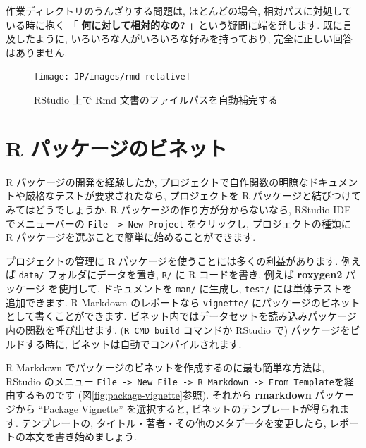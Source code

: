 \documentclass[
  11pt,
  lualatex,ja=standard,jafont=noto]{bxjsreport}
\begin{document}
作業ディレクトリのうんざりする問題は, ほとんどの場合, 相対パスに対処している時に抱く 「 \textbf{何に対して相対的なの?} 」という疑問に端を発します. 既に言及したように, いろいろな人がいろいろな好みを持っており, 完全に正しい回答はありません.

\begin{figure}

{\centering \texttt{[image: JP/images/rmd-relative]} 

}

\caption{RStudio 上で Rmd 文書のファイルパスを自動補完する}\label{fig:rmd-relative}
\end{figure}

\hypertarget{package-vignette}{%
\section{R パッケージのビネット}\label{package-vignette}}

R パッケージの開発を経験したか, プロジェクトで自作関数の明瞭なドキュメントや厳格なテストが要求されたなら, プロジェクトを R パッケージと結びつけてみてはどうでしょうか. R パッケージの作り方が分からないなら, RStudio IDE でメニューバーの \texttt{File -\textgreater{}\ New\ Project} をクリックし, プロジェクトの種類に R パッケージを選ぶことで簡単に始めることができます.

プロジェクトの管理に R パッケージを使うことには多くの利益があります. 例えば \texttt{data/} フォルダにデータを置き, \texttt{R/} に R コードを書き, 例えば \textbf{roxygen2} パッケージ \autocite{R-roxygen2} を使用して, ドキュメントを \texttt{man/} に生成し, \texttt{test/} には単体テストを追加できます. R Markdown のレポートなら \texttt{vignette/} にパッケージのビネットとして書くことができます. ビネット内ではデータセットを読み込みパッケージ内の関数を呼び出せます. (\texttt{R CMD build} コマンドか RStudio で) パッケージをビルドする時に, ビネットは自動でコンパイルされます.

R Markdown でパッケージのビネットを作成するのに最も簡単な方法は, RStudio のメニュー \texttt{File -\textgreater{}\ New\ File\ -\textgreater{}\ R\ Markdown\ -\textgreater{}\ From\ Template}を経由するものです (図\ref{fig:package-vignette}参照). それから \textbf{rmarkdown} パッケージから ``Package Vignette'' を選択すると, ビネットのテンプレートが得られます. テンプレートの, タイトル・著者・その他のメタデータを変更したら, レポートの本文を書き始めましょう.
\end{document}
